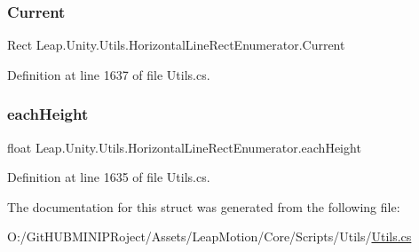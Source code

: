 \subsubsection{\texorpdfstring{Current}{Current}}
{\footnotesize\ttfamily Rect Leap.\+Unity.\+Utils.\+Horizontal\+Line\+Rect\+Enumerator.\+Current\hspace{0.3cm}{\ttfamily [get]}}



Definition at line 1637 of file Utils.\+cs.

\mbox{\label{struct_leap_1_1_unity_1_1_utils_1_1_horizontal_line_rect_enumerator_aaa16d5668db6d91b3138a02f5141c50a}} 
\subsubsection{\texorpdfstring{eachHeight}{eachHeight}}
{\footnotesize\ttfamily float Leap.\+Unity.\+Utils.\+Horizontal\+Line\+Rect\+Enumerator.\+each\+Height\hspace{0.3cm}{\ttfamily [get]}}



Definition at line 1635 of file Utils.\+cs.



The documentation for this struct was generated from the following file\+:\begin{DoxyCompactItemize}
\item 
O\+:/\+Git\+H\+U\+B\+M\+I\+N\+I\+P\+Roject/\+Assets/\+Leap\+Motion/\+Core/\+Scripts/\+Utils/\mbox{\hyperlink{_utils_8cs}{Utils.\+cs}}\end{DoxyCompactItemize}
